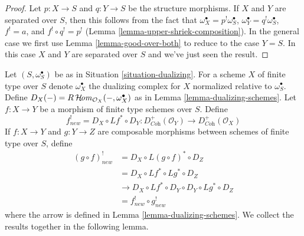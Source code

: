 \begin{proof}
Let $p : X \to S$ and $q : Y \to S$ be the structure morphisms.
If $X$ and $Y$ are separated over $S$, then this follows
from the fact that $\omega_X^\bullet = p^!\omega_S^\bullet$,
$\omega_Y^\bullet = q^!\omega_S^\bullet$, $f^! = a$, and
$f^! \circ q^! = p^!$ (Lemma \ref{lemma-upper-shriek-composition}).
In the general case we first use Lemma \ref{lemma-good-over-both}
to reduce to the case $Y = S$. In this case $X$ and $Y$
are separated over $S$ and we've just seen the result.
\end{proof}

\noindent
Let $(S, \omega_S^\bullet)$ be as in Situation \ref{situation-dualizing}.
For a scheme $X$ of finite type over $S$ denote $\omega_X^\bullet$ the
dualizing complex for $X$ normalized relative to $\omega_S^\bullet$.
Define $D_X(-) = R\mathop{\mathcal{H}\!\mathit{om}}\nolimits_{\mathcal{O}_X}(-, \omega_X^\bullet)$
as in Lemma \ref{lemma-dualizing-schemes}.
Let $f : X \to Y$ be a morphism of finite type schemes over $S$.
Define
$$
f_{new}^! = D_X \circ Lf^* \circ D_Y :
D_{\textit{Coh}}^+(\mathcal{O}_Y)
\to
D_{\textit{Coh}}^+(\mathcal{O}_X)
$$
If $f : X \to Y$ and $g : Y \to Z$ are composable
morphisms between schemes of finite type over $S$, define
\begin{align*}
(g \circ f)^!_{new} & = D_X \circ L(g \circ f)^* \circ D_Z \\
& = D_X \circ Lf^* \circ Lg^* \circ D_Z \\
& \to D_X \circ Lf^* \circ D_Y \circ D_Y \circ Lg^* \circ D_Z \\
& = f^!_{new} \circ g^!_{new}
\end{align*}
where the arrow is defined in Lemma \ref{lemma-dualizing-schemes}.
We collect the results together in the following lemma.

